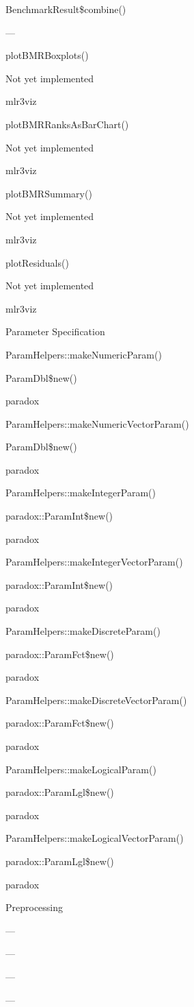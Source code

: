 \documentclass[]{article}
\begin{document}
BenchmarkResult\$combine()

---

plotBMRBoxplots()

Not yet implemented

mlr3viz

plotBMRRanksAsBarChart()

Not yet implemented

mlr3viz

plotBMRSummary()

Not yet implemented

mlr3viz

plotResiduals()

Not yet implemented

mlr3viz

Parameter Specification

ParamHelpers::makeNumericParam()

ParamDbl\$new()

paradox

ParamHelpers::makeNumericVectorParam()

ParamDbl\$new()

paradox

ParamHelpers::makeIntegerParam()

paradox::ParamInt\$new()

paradox

ParamHelpers::makeIntegerVectorParam()

paradox::ParamInt\$new()

paradox

ParamHelpers::makeDiscreteParam()

paradox::ParamFct\$new()

paradox

ParamHelpers::makeDiscreteVectorParam()

paradox::ParamFct\$new()

paradox

ParamHelpers::makeLogicalParam()

paradox::ParamLgl\$new()

paradox

ParamHelpers::makeLogicalVectorParam()

paradox::ParamLgl\$new()

paradox

Preprocessing

---

---

---

---
\end{document}

